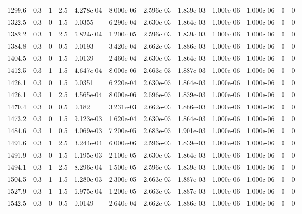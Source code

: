 \documentclass[preview]{standalone}
\begin{document}
{{{\begin{tabular}{L{1.2cm}C{1.2cm} C{0.3cm}C{0.5cm} C{1.4cm}C{1.4cm} C{1.4cm}C{1.4cm} C{1.6cm}C{1.6cm} C{1.6cm}C{1.6cm}}
  1299.6  &   0.3  & 1     & 2.5 &  4.278e-04  & 8.000e-06  &  2.596e-03&   1.839e-03& 1.000e-06 & 1.000e-06   &  0 & 0  \\ 
  1322.5  &   0.3  & 0     & 1.5 &  0.0355  & 6.290e-04  &  2.630e-03&   1.864e-03& 1.000e-06 & 1.000e-06   &  0 & 0  \\ 
  1382.2  &   0.3  & 1     & 2.5 &  6.824e-04  & 1.200e-05  &  2.596e-03&   1.839e-03& 1.000e-06 & 1.000e-06   &  0 & 0  \\ 
  1384.8  &   0.3  & 0     & 0.5 &  0.0193  & 3.420e-04  &  2.662e-03&   1.886e-03& 1.000e-06 & 1.000e-06   &  0 & 0  \\ 
  1404.5  &   0.3  & 0     & 1.5 &  0.0139  & 2.460e-04  &  2.630e-03&   1.864e-03& 1.000e-06 & 1.000e-06   &  0 & 0  \\ 
  1412.5  &   0.3  & 1     & 1.5 &  4.647e-04  & 8.000e-06  &  2.663e-03&   1.887e-03& 1.000e-06 & 1.000e-06   &  0 & 0  \\ 
  1426.1  &   0.3  & 0     & 1.5 &  0.0351  & 6.220e-04  &  2.630e-03&   1.864e-03& 1.000e-06 & 1.000e-06   &  0 & 0  \\ 
  1426.1  &   0.3  & 1     & 2.5 &  4.565e-04  & 8.000e-06  &  2.596e-03&   1.839e-03& 1.000e-06 & 1.000e-06   &  0 & 0  \\ 
  1470.4  &   0.3  & 0     & 0.5 &  0.182  & 3.231e-03  &  2.662e-03&   1.886e-03& 1.000e-06 & 1.000e-06   &  0 & 0  \\ 
  1473.2  &   0.3  & 0     & 1.5 &  9.123e-03  & 1.620e-04  &  2.630e-03&   1.864e-03& 1.000e-06 & 1.000e-06   &  0 & 0  \\ 
  1484.6  &   0.3  & 1     & 0.5 &  4.069e-03  & 7.200e-05  &  2.683e-03&   1.901e-03& 1.000e-06 & 1.000e-06   &  0 & 0  \\ 
  1491.6  &   0.3  & 1     & 2.5 &  3.244e-04  & 6.000e-06  &  2.596e-03&   1.839e-03& 1.000e-06 & 1.000e-06   &  0 & 0  \\ 
  1491.9  &   0.3  & 0     & 1.5 &  1.195e-03  & 2.100e-05  &  2.630e-03&   1.864e-03& 1.000e-06 & 1.000e-06   &  0 & 0  \\ 
  1494.1  &   0.3  & 1     & 2.5 &  8.296e-04  & 1.500e-05  &  2.596e-03&   1.839e-03& 1.000e-06 & 1.000e-06   &  0 & 0  \\ 
  1504.5  &   0.3  & 1     & 1.5 &  1.280e-03  & 2.300e-05  &  2.663e-03&   1.887e-03& 1.000e-06 & 1.000e-06   &  0 & 0  \\ 
  1527.9  &   0.3  & 1     & 1.5 &  6.975e-04  & 1.200e-05  &  2.663e-03&   1.887e-03& 1.000e-06 & 1.000e-06   &  0 & 0  \\ 
  1542.5  &   0.3  & 0     & 0.5 &  0.0149  & 2.640e-04  &  2.662e-03&   1.886e-03& 1.000e-06 & 1.000e-06   &  0 & 0  \\ 
\hline 
\end{tabular} 

}}}
\end{document}
